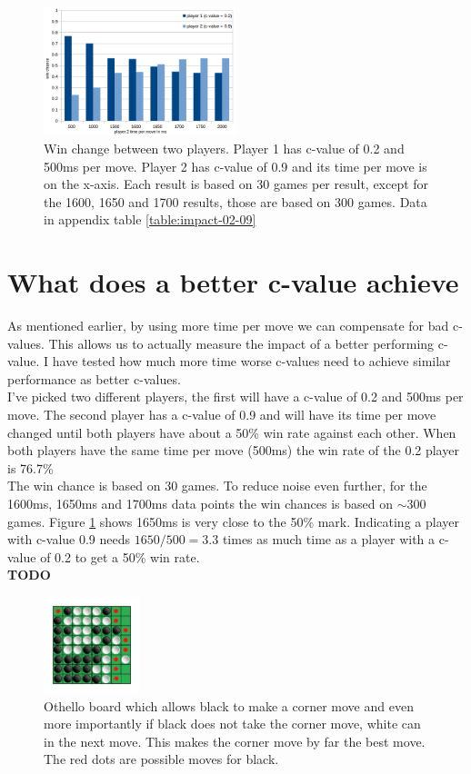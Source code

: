 \documentclass[
11pt, %
english, %
singlespacing, %
headsepline, %
]{MastersDoctoralThesis} %
\begin{document}
\begin{figure}[h]
	\centering
	\includegraphics[width=0.5\textwidth]{images/mcts-significance}
	\caption{Win change between two players. Player 1 has c-value of 0.2 and 500ms per move. Player 2 has c-value of 0.9 and its time per move is on the x-axis. Each result is based on 30 games per result, except for the 1600, 1650 and 1700 results, those are based on 300 games. Data in appendix table \ref{table:impact-02-09}}
	\label{fig:mcts-significance}
\end{figure}
\section{What does a better c-value achieve}
As mentioned earlier, by using more time per move we can compensate for bad c-values. This allows us to actually measure the impact of a better performing c-value. I have tested how much more time worse c-values need to achieve similar performance as better c-values.\\
I've picked two different players, the first will have a c-value of 0.2 and 500ms per move. The second player has a c-value of 0.9 and will have its time per move changed until both players have about a 50\% win rate against each other. When both players have the same time per move (500ms) the win rate of the 0.2 player is 76.7\%\\
The win chance is based on 30 games. To reduce noise even further, for the 1600ms, 1650ms and 1700ms data points the win chances is based on $\sim300$ games. Figure \ref{fig:mcts-significance} shows 1650ms is very close to the 50\% mark. Indicating a player with c-value 0.9 needs $1650/500 = 3.3$ times as much time as a player with a c-value of 0.2 to get a 50\% win rate.\\


\textbf{TODO}
\begin{figure}[h]
	\centering
	\includegraphics[width=0.25\textwidth]{images/corner-board}
	\caption{Othello board which allows black to make a corner move and even more importantly if black does not take the corner move, white can in the next move. This makes the corner move by far the best move. The red dots are possible moves for black.}
	\label{fig:othello-corner-board}
\end{figure}
\end{document}
